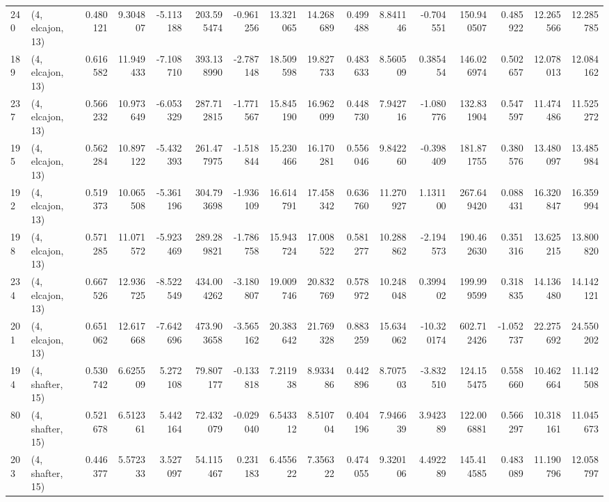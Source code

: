 \begin{tabular}{llrrrrrrrrrrrrrr}
240 &  (4, elcajon, 13) &   0.480121 &   9.304807 & -5.113188 &  203.595474 & -0.961256 &  13.321065 &  14.268689 &  0.499488 &   8.841146 &  -0.704551 &  150.940507 &  0.485922 &  12.265566 &  12.285785 \\
189 &  (4, elcajon, 13) &   0.616582 &  11.949433 & -7.108710 &  393.138990 & -2.787148 &  18.509598 &  19.827733 &  0.483633 &   8.560509 &   0.385454 &  146.026974 &  0.502657 &  12.078013 &  12.084162 \\
237 &  (4, elcajon, 13) &   0.566232 &  10.973649 & -6.053329 &  287.712815 & -1.771567 &  15.845190 &  16.962099 &  0.448730 &   7.942716 &  -1.080776 &  132.831904 &  0.547597 &  11.474486 &  11.525272 \\
195 &  (4, elcajon, 13) &   0.562284 &  10.897122 & -5.432393 &  261.477975 & -1.518844 &  15.230466 &  16.170281 &  0.556046 &   9.842260 &  -0.398409 &  181.871755 &  0.380576 &  13.480097 &  13.485984 \\
192 &  (4, elcajon, 13) &   0.519373 &  10.065508 & -5.361196 &  304.793698 & -1.936109 &  16.614791 &  17.458342 &  0.636760 &  11.270927 &   1.131100 &  267.649420 &  0.088431 &  16.320847 &  16.359994 \\
198 &  (4, elcajon, 13) &   0.571285 &  11.071572 & -5.923469 &  289.289821 & -1.786758 &  15.943724 &  17.008522 &  0.581277 &  10.288862 &  -2.194573 &  190.462630 &  0.351316 &  13.625215 &  13.800820 \\
234 &  (4, elcajon, 13) &   0.667526 &  12.936725 & -8.522549 &  434.004262 & -3.180807 &  19.009746 &  20.832769 &  0.578972 &  10.248048 &   0.399402 &  199.999599 &  0.318835 &  14.136480 &  14.142121 \\
201 &  (4, elcajon, 13) &   0.651062 &  12.617668 & -7.642696 &  473.903658 & -3.565162 &  20.383642 &  21.769328 &  0.883259 &  15.634062 & -10.320174 &  602.712426 & -1.052737 &  22.275692 &  24.550202 \\
194 &  (4, shafter, 15) &   0.530742 &   6.625509 &  5.272108 &   79.807177 & -0.133818 &   7.211938 &   8.933486 &  0.442896 &   8.707503 &  -3.832510 &  124.155475 &  0.558660 &  10.462664 &  11.142508 \\
80  &  (4, shafter, 15) &   0.521678 &   6.512361 &  5.442164 &   72.432079 & -0.029040 &   6.543312 &   8.510704 &  0.404196 &   7.946639 &   3.942389 &  122.006881 &  0.566297 &  10.318161 &  11.045673 \\
203 &  (4, shafter, 15) &   0.446377 &   5.572333 &  3.527097 &   54.115467 &  0.231183 &   6.455622 &   7.356322 &  0.474055 &   9.320106 &   4.492289 &  145.414585 &  0.483089 &  11.190796 &  12.058797 \\

\end{tabular}
